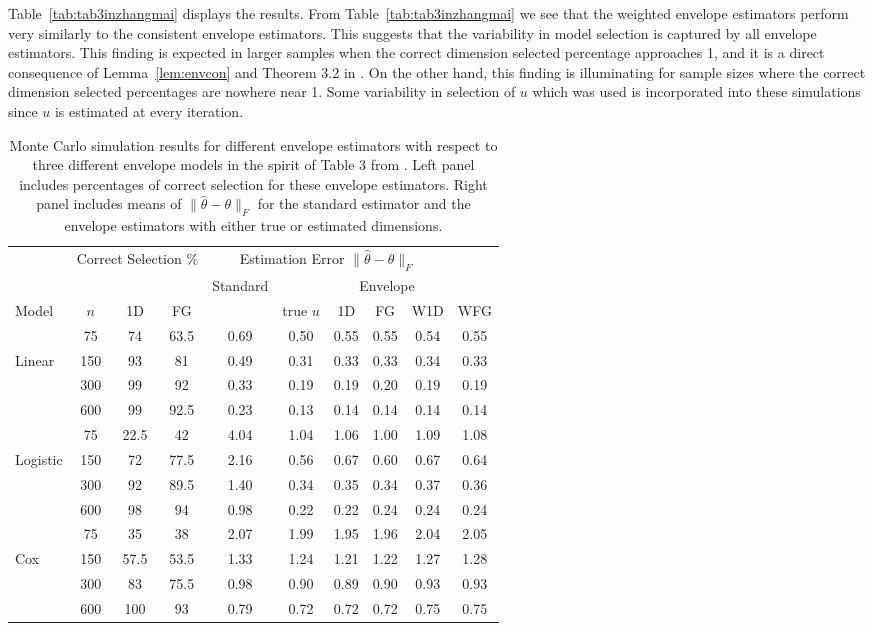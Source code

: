 \documentclass{article}\usepackage[]{graphicx}\usepackage[]{color}
\begin{document}
Table~\ref{tab:tab3inzhangmai} displays the results. From Table~\ref{tab:tab3inzhangmai} we see that the weighted envelope estimators perform very similarly to the consistent envelope estimators. This suggests that the variability in model selection is captured by all envelope estimators. This finding is expected in larger samples when the correct dimension selected percentage approaches 1, and it is a direct consequence of Lemma~\ref{lem:envcon} and Theorem 3.2 in \citet{zhangmai}. On the other hand, this finding is illuminating for sample sizes where the correct dimension selected percentages are nowhere near 1. Some variability in selection of $u$ which was used is incorporated into these simulations since $u$ is estimated at every iteration. 

\begin{table}[t]
\caption{\footnotesize Monte Carlo simulation results for different envelope estimators with respect to three different envelope models in the spirit of Table 3 from \citet{zhangmai}. Left panel includes percentages of correct selection for these envelope estimators. Right panel includes means of $\|\hat{\theta} - \theta\|_F$ for the standard estimator and the envelope estimators with either true or estimated dimensions.}
\begin{center}
\begin{tabular}{lccc|cccccc}
    & \multicolumn{3}{c|}{Correct Selection \%} 
    & \multicolumn{5}{c}{Estimation Error $\|\hat{\theta} - \theta\|_F$} & \\
    & & & & Standard & \multicolumn{5}{c}{Envelope} \\
  Model  & $n$ & 1D & FG & & true $u$ & 1D & FG & W1D & WFG \\ 
  \hline
  		 &  75 & 74 & 63.5 & 0.69 & 0.50 & 0.55 & 0.55 & 0.54 & 0.55 \\
  Linear & 150 & 93 & 81 & 0.49 & 0.31 & 0.33 & 0.33 & 0.34 & 0.33 \\
         & 300 & 99 & 92 & 0.33 & 0.19 & 0.19 & 0.20 & 0.19 & 0.19 \\
  		 & 600 & 99 & 92.5 & 0.23 & 0.13 & 0.14 & 0.14 & 0.14 & 0.14 \\
  		 \hline
  		  &  75 & 22.5 & 42   & 4.04 & 1.04 & 1.06 & 1.00 & 1.09 & 1.08 \\
 Logistic & 150 & 72   & 77.5 & 2.16 & 0.56 & 0.67 & 0.60 & 0.67 & 0.64 \\
          & 300 & 92   & 89.5 & 1.40 & 0.34 & 0.35 & 0.34 & 0.37 & 0.36 \\
  		  & 600 & 98   & 94   & 0.98 & 0.22 & 0.22 & 0.24 & 0.24 & 0.24 \\
  		  \hline
 		  &  75 & 35   & 38   & 2.07 & 1.99 & 1.95 & 1.96 & 2.04 & 2.05 \\
      Cox & 150 & 57.5 & 53.5 & 1.33 & 1.24 & 1.21 & 1.22 & 1.27 & 1.28 \\
          & 300 & 83   & 75.5 & 0.98 & 0.90 & 0.89 & 0.90 & 0.93 & 0.93 \\
  		  & 600 & 100  & 93   & 0.79 & 0.72 & 0.72 & 0.72 & 0.75 & 0.75 \\  		  
  		  \hline
\end{tabular}
\end{center}


\end{table}
\end{document}
